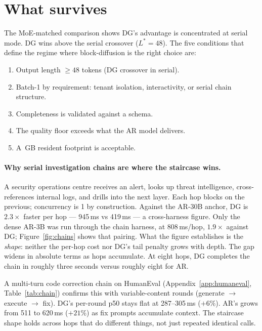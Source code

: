 \section{What survives}
\label{sec:survives}

The MoE-matched comparison shows DG's advantage is concentrated at
serial mode. DG wins above the serial crossover ($L^{*}{=}48$). The
five conditions that define the regime where block-diffusion is the
right choice are:
\begin{enumerate}[nosep]
  \item Output length $\geq 48$ tokens (DG crossover in serial).
  \item Batch-1 by requirement: tenant isolation, interactivity, or
    serial chain structure.
  \item Completeness is validated against a schema.
  \item The quality floor exceeds what the AR model delivers.
  \item A \dgWeights\,GB resident footprint is acceptable.
\end{enumerate}

\paragraph{Why serial investigation chains are where the staircase wins.}

A security operations centre receives an alert, looks up threat
intelligence, cross-references internal logs, and drills into the next
layer. Each hop blocks on the previous; concurrency is 1 by
construction. Against the AR-30B anchor, DG is $2.3\times$ faster per
hop --- 945\,ms vs 419\,ms --- a cross-harness figure. Only the dense
AR-3B was run through the chain harness, at 808\,ms/hop, $1.9\times$
against DG; Figure~\ref{fig:chains} shows that pairing. What the
figure establishes is the \emph{shape}: neither the per-hop cost nor
DG's tail penalty grows with depth. The gap widens in absolute terms
as hops accumulate. At eight hops, DG completes the chain in roughly
three seconds versus roughly eight for AR.

A multi-turn code correction chain on HumanEval
(Appendix~\ref{app:humaneval}, Table~\ref{tab:chain}) confirms this
with variable-content rounds (generate $\to$ execute $\to$ fix).
DG's per-round p50 stays flat at 287--305\,ms ($+6\%$). AR's grows
from 511 to 620\,ms ($+21\%$) as fix prompts accumulate context. The
staircase shape holds across hops that do different things, not just
repeated identical calls.

